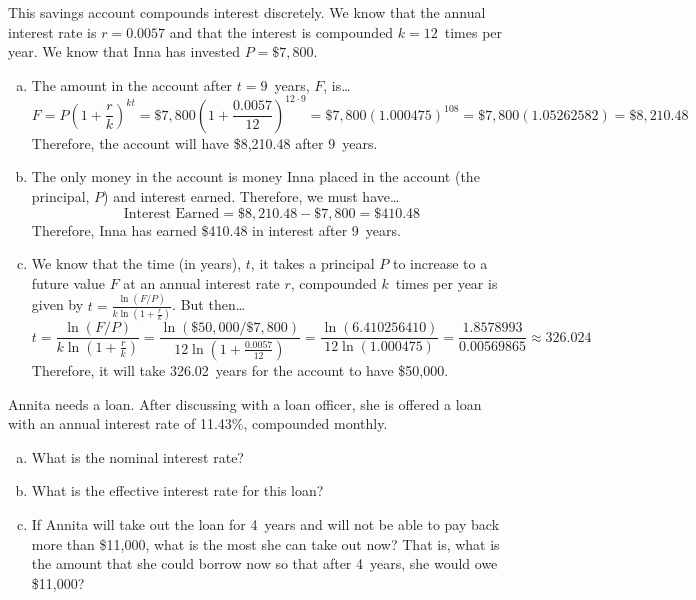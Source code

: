 \documentclass[11pt,letterpaper]{article}
\begin{document}
\sol This savings account compounds interest discretely. We know that the annual interest rate is $r= 0.0057$ and that the interest is compounded $k= 12$~times per year. We know that Inna has invested $P= \$7,\!800$. 
\begin{enumerate}[(a)]
\item The amount in the account after $t= 9$~years, $F$, is\dots
	\[
	F= P \left(1 + \dfrac{r}{k} \right)^{kt}= \$7,\!800 \left(1 + \dfrac{0.0057}{12} \right)^{12 \cdot 9}= \$7,\!800 (1.000475)^{108}= \$7,\!800 (1.05262582)= \$8,\!210.48
	\] 
Therefore, the account will have \$8,210.48 after 9~years. \pspace

\item The only money in the account is money Inna placed in the account (the principal, $P$) and interest earned. Therefore, we must have\dots
	\[
	\text{Interest Earned}= \$8,\!210.48 - \$7,\!800= \$410.48
	\]
Therefore, Inna has earned \$410.48 in interest after 9~years. \pspace

\item We know that the time (in years), $t$, it takes a principal $P$ to increase to a future value $F$ at an annual interest rate $r$, compounded $k$~times per year is given by $t= \frac{\ln(F/P)}{k \ln(1 + \frac{r}{k})}$. But then\dots
	\[
	t= \dfrac{\ln(F/P)}{k \ln(1 + \frac{r}{k})}= \dfrac{\ln(\$50,\!000/\$7,\!800)}{12 \ln(1 + \frac{0.0057}{12})}= \dfrac{\ln(6.410256410)}{12 \ln(1.000475)}= \dfrac{1.8578993}{0.00569865} \approx 326.024
	\]
Therefore, it will take 326.02~years for the account to have \$50,000. 
\end{enumerate}



\newpage



 Annita needs a loan. After discussing with a loan officer, she is offered a loan with an annual interest rate of 11.43\%, compounded monthly. 
	\begin{enumerate}[(a)]
	\item What is the nominal interest rate?
	\item What is the effective interest rate for this loan?
	\item If Annita will take out the loan for 4~years and will not be able to pay back more than \$11,000, what is the most she can take out now? That is, what is the amount that she could borrow now so that after 4~years, she would owe \$11,000?
	\end{enumerate} \pspace
\end{document}
